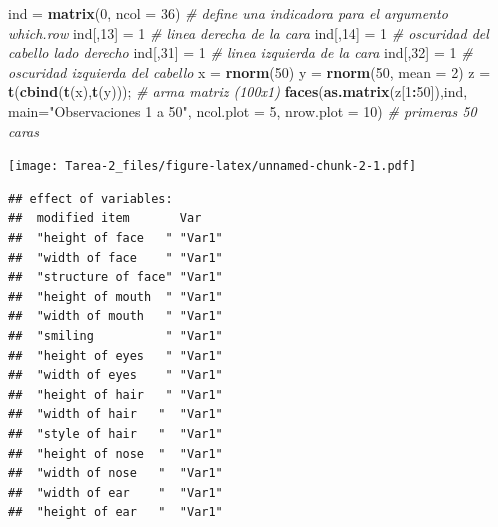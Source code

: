 \documentclass[
]{article}
\newenvironment{Shaded}{\begin{snugshade}}{\end{snugshade}}
\newcommand{\CommentTok}[1]{\textcolor[rgb]{0.56,0.35,0.01}{\textit{#1}}}
\newcommand{\DataTypeTok}[1]{\textcolor[rgb]{0.13,0.29,0.53}{#1}}
\newcommand{\DecValTok}[1]{\textcolor[rgb]{0.00,0.00,0.81}{#1}}
\newcommand{\KeywordTok}[1]{\textcolor[rgb]{0.13,0.29,0.53}{\textbf{#1}}}
\newcommand{\NormalTok}[1]{#1}
\newcommand{\OperatorTok}[1]{\textcolor[rgb]{0.81,0.36,0.00}{\textbf{#1}}}
\newcommand{\StringTok}[1]{\textcolor[rgb]{0.31,0.60,0.02}{#1}}
\begin{document}
\begin{Shaded}
\begin{Highlighting}[]
\NormalTok{  ind      =}\StringTok{ }\KeywordTok{matrix}\NormalTok{(}\DecValTok{0}\NormalTok{, }\DataTypeTok{ncol =} \DecValTok{36}\NormalTok{)   }\CommentTok{# define una indicadora para el argumento which.row}
\NormalTok{  ind[,}\DecValTok{13}\NormalTok{] =}\StringTok{ }\DecValTok{1}                      \CommentTok{# linea derecha de la cara}
\NormalTok{  ind[,}\DecValTok{14}\NormalTok{] =}\StringTok{ }\DecValTok{1}                      \CommentTok{# oscuridad del cabello lado derecho}
\NormalTok{  ind[,}\DecValTok{31}\NormalTok{] =}\StringTok{ }\DecValTok{1}                      \CommentTok{# linea izquierda de la cara}
\NormalTok{  ind[,}\DecValTok{32}\NormalTok{] =}\StringTok{ }\DecValTok{1}                      \CommentTok{# oscuridad izquierda del cabello}
\NormalTok{  x      =}\StringTok{ }\KeywordTok{rnorm}\NormalTok{(}\DecValTok{50}\NormalTok{)               }
\NormalTok{  y      =}\StringTok{ }\KeywordTok{rnorm}\NormalTok{(}\DecValTok{50}\NormalTok{, }\DataTypeTok{mean =} \DecValTok{2}\NormalTok{) }
\NormalTok{  z      =}\StringTok{ }\KeywordTok{t}\NormalTok{(}\KeywordTok{cbind}\NormalTok{(}\KeywordTok{t}\NormalTok{(x),}\KeywordTok{t}\NormalTok{(y)));    }\CommentTok{# arma matriz (100x1)}
  \KeywordTok{faces}\NormalTok{(}\KeywordTok{as.matrix}\NormalTok{(z[}\DecValTok{1}\OperatorTok{:}\DecValTok{50}\NormalTok{]),ind, }\DataTypeTok{main=}\StringTok{"Observaciones 1 a 50"}\NormalTok{, }\DataTypeTok{ncol.plot =} \DecValTok{5}\NormalTok{, }\DataTypeTok{nrow.plot =} \DecValTok{10}\NormalTok{) }\CommentTok{# primeras 50 caras}
\end{Highlighting}
\end{Shaded}

\texttt{[image: Tarea-2\_files/figure-latex/unnamed-chunk-2-1.pdf]}

\begin{verbatim}
## effect of variables:
##  modified item       Var   
##  "height of face   " "Var1"
##  "width of face    " "Var1"
##  "structure of face" "Var1"
##  "height of mouth  " "Var1"
##  "width of mouth   " "Var1"
##  "smiling          " "Var1"
##  "height of eyes   " "Var1"
##  "width of eyes    " "Var1"
##  "height of hair   " "Var1"
##  "width of hair   "  "Var1"
##  "style of hair   "  "Var1"
##  "height of nose  "  "Var1"
##  "width of nose   "  "Var1"
##  "width of ear    "  "Var1"
##  "height of ear   "  "Var1"
\end{verbatim}
\end{document}
